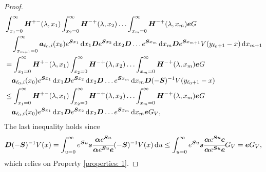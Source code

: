 \begin{proof}
\begin{align}
	&\int_{x_1=0}^\infty \boldsymbol H^{+-}(\lambda,x_1)\nonumber
	\int_{x_2=0}^\infty \boldsymbol H^{-+}(\lambda,x_2) 
	\hdots \int_{x_m=0}^\infty \boldsymbol H^{-+}(\lambda, x_m) \boldsymbol eG
	\\&\quad\int_{x_{m+1}=0}^\infty \boldsymbol   a_{\ell_0,i}(x_0)e^{\boldsymbol{S}x_1}\, \mathrm{d} x_1 \boldsymbol{D}e^{\boldsymbol{S}x_2} \, \mathrm{d} x_2 \boldsymbol{D}\dots e^{\boldsymbol{S}x_m} \, \mathrm{d} x_m \boldsymbol{D}e^{\boldsymbol{S}x_{m+1}}V(y_{\ell_0+1}-x)\, \mathrm{d} x_{m+1} \nonumber
	\\&=\int_{x_1=0}^\infty \boldsymbol H^{+-}(\lambda,x_1)\nonumber
	\int_{x_2=0}^\infty \boldsymbol H^{-+}(\lambda,x_2) 
	\hdots \int_{x_m=0}^\infty \boldsymbol H^{-+}(\lambda, x_m) \boldsymbol eG
	\\&\quad \boldsymbol   a_{\ell_0,i}(x_0)e^{\boldsymbol{S}x_1}\, \mathrm{d} x_1 \boldsymbol{D}e^{\boldsymbol{S}x_2} \, \mathrm{d} x_2 \boldsymbol{D}\dots e^{\boldsymbol{S}x_m} \, \mathrm{d} x_m \boldsymbol{D}(-\boldsymbol{S})^{-1}V(y_{\ell_0+1}-x) \nonumber
	\\&\leq\int_{x_1=0}^\infty \boldsymbol H^{+-} (\lambda,x_1)\nonumber
	\int_{x_2=0}^\infty \boldsymbol H^{-+} (\lambda,x_2) 
	\hdots \int_{x_m=0}^\infty \boldsymbol H^{-+} (\lambda, x_m) \boldsymbol eG
	\\&\quad\boldsymbol   a_{\ell_0,i}(x_0)e^{\boldsymbol{S}x_1}\, \mathrm{d} x_1 \boldsymbol{D}e^{\boldsymbol{S}x_2} \, \mathrm{d} x_2 \boldsymbol{D}\dots e^{\boldsymbol{S}x_m} \, \mathrm{d} x_m \boldsymbol eG_V, \label{eqn: this 12}	
        \end{align}
        The last inequality holds since 
        \[\boldsymbol D(-\boldsymbol S)^{-1}V(x) = \int_{u=0}^\infty e^{\boldsymbol Su}\boldsymbol s\cfrac{\boldsymbol \alpha e^{\boldsymbol S u}}{\boldsymbol \alpha e^{\boldsymbol S u}\boldsymbol e}(-\boldsymbol S)^{-1}V(x)\, \mathrm{d} u \leq \int_{u=0}^\infty e^{\boldsymbol Su}\boldsymbol s\cfrac{\boldsymbol \alpha e^{\boldsymbol S u}\boldsymbol e}{\boldsymbol \alpha e^{\boldsymbol S u}\boldsymbol e}G_V = \boldsymbol eG_V,\]
        which relies on Property \ref{properties: 1}. 
        

\end{proof}
